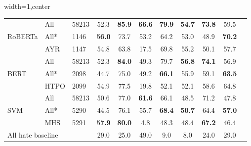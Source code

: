 \begin{table}[ht]
\begin{adjustbox}{width=1\textwidth,center}
\begin{tabular}{lll|cccccccc}
    \multicolumn{1}{l|}{\multirow{3}{*}{RoBERTa}}     & All         & 58213           & 52.3               & \textbf{85.9}      & \textbf{66.6}      & \textbf{79.9}         & \textbf{54.7}          & \textbf{73.8}          & 59.5                   \\
    \multicolumn{1}{l|}{}                             & All*        & 1146            & \textbf{56.0}      & 73.7               & 53.2               & 64.2                  & 53.0                   & 48.9                   & \textbf{70.2}          \\
    \multicolumn{1}{l|}{}                             & AYR         & 1147            & 54.8               & 63.8               & 17.5               & 69.8                  & 55.2                   & 50.1                   & 57.7                   \\ \hline
    \multicolumn{1}{l|}{\multirow{3}{*}{BERT}}        & All         & 58213           & 52.3               & \textbf{84.0}      & 49.3               & 79.7                  & \textbf{56.8}          & \textbf{74.1}          & 56.9                   \\
    \multicolumn{1}{l|}{}                             & All*        & 2098            & 44.7               & 75.0               & 49.2               & \textbf{66.1}         & 55.9                   & 59.1                   & \textbf{63.5}          \\
    \multicolumn{1}{l|}{}                             & HTPO        & 2099            & 54.9               & 77.5               & 19.8               & 52.1                  & 52.1                   & 58.6                   & 64.8                   \\ \hline
    \multicolumn{1}{l|}{\multirow{3}{*}{SVM}}         & All         & 58213           & 50.6               & 77.0               & \textbf{61.6}      & 66.1                  & 48.5                   & 71.2                   & 47.8                   \\
    \multicolumn{1}{l|}{}                             & All*        & 5290            & 44.5               & 76.1               & 55.7               & \textbf{68.4}         & \textbf{50.7}          & 64.4                   & \textbf{57.0}          \\
    \multicolumn{1}{l|}{}                             & MHS         & 5291            & \textbf{57.9}      & \textbf{80.0}      & 4.8                & 48.3                  & 48.4                   & \textbf{67.2}          & 46.4                   \\ \hline
    \multicolumn{3}{l|}{All hate baseline}                         & 29.0         & 25.0          & 49.0          & 9.0         & 8.0         & 24.0         & 29.0         \\ \hline
    \end{tabular}
    \end{adjustbox}
    

\end{table}
